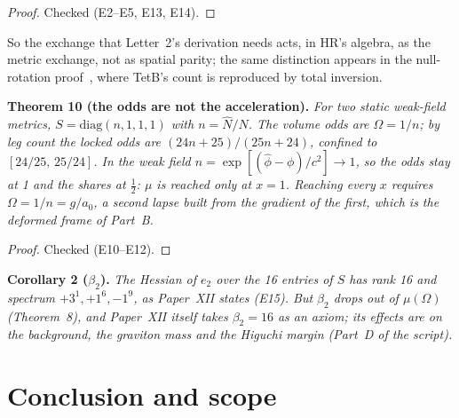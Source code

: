 \documentclass[twocolumn]{iopjournal}
\begin{document}
\begin{proof}
Checked (E2--E5, E13, E14).
\end{proof}

So the exchange that Letter~2's derivation needs acts, in HR's algebra,
as the metric exchange, not as spatial parity; the same distinction
appears in the null-rotation proof~\cite{NelsonNull}, where TetB's
count is reproduced by total inversion.

\textbf{Theorem 10 (the odds are not the acceleration).} \emph{For two
static weak-field metrics, $S = \mathrm{diag}(n,1,1,1)$ with
$n = \hat N/N$. The volume odds are $\Omega = 1/n$; by leg count the
locked odds are $(24n+25)/(25n+24)$, confined to $[24/25,\,25/24]$. In
the weak field $n = \exp[(\hat\phi-\phi)/c^2]\to1$, so the odds stay at
1 and the shares at $\tfrac12$: $\mu$ is reached only at $x = 1$.
Reaching every $x$ requires $\Omega = 1/n = g/a_0$, a second lapse built
from the gradient of the first, which is the deformed frame of Part~B.}

\begin{proof}
Checked (E10--E12).
\end{proof}

\textbf{Corollary 2 ($\beta_2$).} \emph{The Hessian of $e_2$ over the
16 entries of $S$ has rank 16 and spectrum $+3^1, +1^6, -1^9$, as
Paper~XII states (E15). But $\beta_2$ drops out of $\mu(\Omega)$
(Theorem~8), and Paper~XII itself takes $\beta_2 = 16$ as an axiom;
its effects are on the background, the graviton mass and the Higuchi
margin (Part~D of the script).}

\section*{Conclusion and scope}
\end{document}
